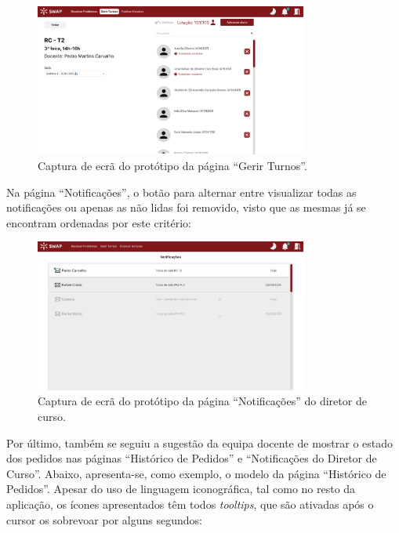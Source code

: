 \documentclass[12pt, a4paper]{article}
\begin{document}
\begin{figure}[H]
    \centering
    \includegraphics[width=0.8\textwidth]{res/prototype/gerir-turnos-revisto.png}
    \caption{Captura de ecrã do protótipo da página ``Gerir Turnos''.}
    \label{gerir-turnos-revisto}
\end{figure}

Na página ``Notificações'', o botão para alternar entre visualizar todas as notificações ou apenas
as não lidas foi removido, visto que as mesmas já se encontram ordenadas por este critério:

\begin{figure}[H]
    \centering
    \includegraphics[width=0.8\textwidth]{res/prototype/notificacoes-diretor-revisto.png}
    \caption{Captura de ecrã do protótipo da página ``Notificações'' do diretor de curso.}
    \label{notificacoes-diretor-revisto}
\end{figure}

Por último, também se seguiu a sugestão da equipa docente de mostrar o estado dos pedidos nas
páginas ``Histórico de Pedidos'' e ``Notificações do Diretor de Curso''. Abaixo, apresenta-se, como
exemplo, o modelo da página ``Histórico de Pedidos''. Apesar do uso de linguagem iconográfica, tal
como no resto da aplicação, os ícones apresentados têm todos \emph{tooltips}, que são ativadas após
o cursor os sobrevoar por alguns segundos:
\end{document}
